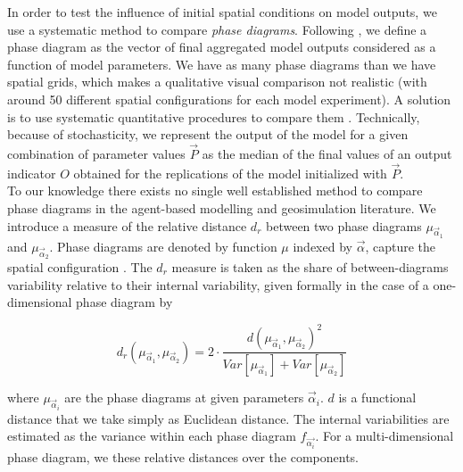 \documentclass[preprint,5p,times,twocolumn,authoryear]{elsarticle}
\begin{document}
In order to test the influence of initial spatial conditions on model outputs, we use a systematic method to compare \emph{phase diagrams}. Following \citet{Gauvinetal2009}, we define a phase diagram as the vector of final aggregated model outputs considered as a function of model parameters. We have as many phase diagrams than we have spatial grids, which makes a qualitative visual comparison not realistic (with around 50 different spatial configurations for each model experiment). A solution is to use systematic quantitative procedures to compare them . Technically, because of stochasticity, we represent the output of the model for a given combination of parameter values $\vec{P}$ as the median  of the final values of an output indicator $O$ obtained for the replications of the model initialized with $\vec{P}$.\\

To our knowledge there exists no single well established method to compare phase diagrams in the agent-based modelling and geosimulation literature. We introduce a measure of the relative distance $d_r$ between two phase diagrams $\mu_{\vec{\alpha}_1}$ and $\mu_{\vec{\alpha}_2}$. Phase diagrams are denoted by  function $\mu$ indexed by  $\vec{\alpha}$,  capture the spatial configuration . The $d_r$ measure is taken as the share of between-diagrams variability relative to their internal variability, given formally in the case of a one-dimensional phase diagram by


\begin{equation}\label{eq:phase-distance}
d_r\left(\mu_{\vec{\alpha}_1},\mu_{\vec{\alpha}_2}\right) = 2 \cdot \frac{d(\mu_{\vec{\alpha}_1},\mu_{\vec{\alpha}_2})^2}{Var\left[\mu_{\vec{\alpha}_1}\right] + Var\left[\mu_{\vec{\alpha}_2}\right]}
\end{equation}

where $\mu_{\vec{\alpha}_i}$ are the phase diagrams at given  parameters $\vec{\alpha}_i$. $d$ is a functional distance that we take simply as Euclidean distance. The internal variabilities are estimated as the variance within each phase diagram $f_{\vec{\alpha_i}}$. For a multi-dimensional phase diagram, we  these relative distances over the components. 
\end{document}
